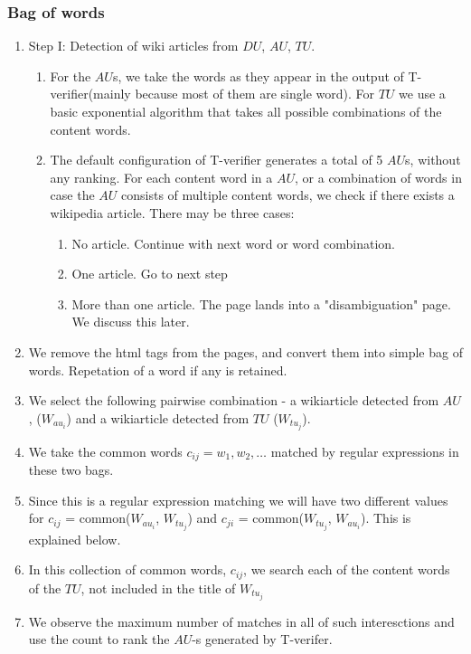 \documentclass[11pt]{article}
\begin{document}
\subsubsection{Bag of words}
\begin{enumerate}
\item Step I: Detection of wiki articles from $DU$, $AU$, $TU$.
\begin {enumerate}
\item For the $AU$s, we take the words as they appear in the output of T-verifier(mainly because most of them are single word). For $TU$ we use a basic exponential algorithm that takes all possible combinations of the content words.
\item The default configuration of T-verifier generates a total of 5 $AU$s, without any ranking.  For each content word in a $AU$, or a combination of words in case the $AU$ consists of multiple content words, we check if there exists a wikipedia article. There may be three cases:
\begin{enumerate}
\item No article. Continue with next word or word combination. 
\item One article. Go to next step
\item More than one article. The page lands into a "disambiguation" page. We discuss this later. 
\end{enumerate}
\end{enumerate}
\item We remove the html tags from the pages, and convert them into simple bag of words. Repetation of a word if any is retained.
\item We select the following pairwise combination - a wikiarticle detected from $AU$, ($W_{au_{i}}$) and a wikiarticle detected from $TU$ ($W_{tu_{j}}$).
\item We take the common words $c_{ij} = {w_{1}, w_{2}, \ldots}$ matched by regular expressions in these two bags.
\item Since this is a regular expression matching we will have two different values for $c_{ij}$ = common($W_{au_{i}}$, $W_{tu_{j}}$) and $c_{ji}$ = common($W_{tu_{j}}$, $W_{au_{i}}$). This is explained below.
\item In this collection of common words, $c_{ij}$, we search each of the content words of the $TU$, not included in the title of $W_{tu_{j}}$ 
\item We observe the maximum number of matches in all of such interesctions and use the count to rank the $AU$-s generated by T-verifer. 
\end{enumerate}
\end{document}
